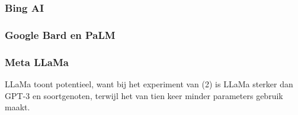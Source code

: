 \subsubsection{Bing AI}



\subsubsection{Google Bard en PaLM}



\subsubsection{Meta LLaMa}



LLaMa toont potentieel, want bij het experiment van (2) is LLaMa sterker dan GPT-3 en soortgenoten, terwijl het van tien keer minder parameters gebruik maakt.










